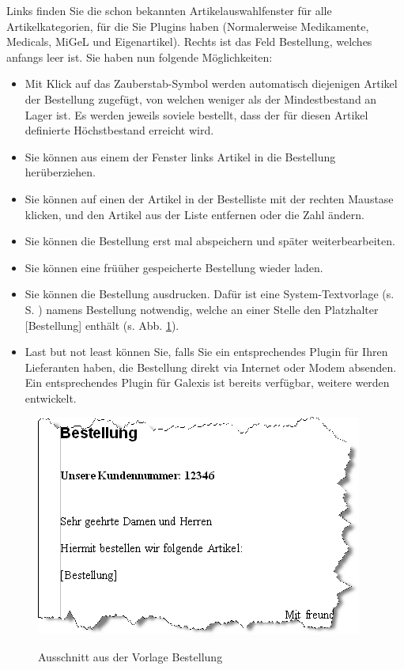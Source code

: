 Links finden Sie die schon bekannten Artikelauswahlfenster für alle
Artikelkategorien, für die Sie Plugins haben (Normalerweise Medikamente,
Medicals, MiGeL und Eigenartikel). Rechts ist das Feld Bestellung, welches
anfangs leer ist. Sie haben nun folgende Möglichkeiten:
\begin{itemize}
  \item Mit Klick auf das Zauberstab-Symbol werden automatisch diejenigen
  Artikel der Bestellung zugefügt, von welchen weniger als der Mindestbestand an
  Lager ist. Es werden jeweils soviele bestellt, dass der für diesen Artikel
  definierte Höchstbestand erreicht wird.
  \item Sie können aus einem der Fenster links Artikel in die Bestellung
  herüberziehen.
	\item Sie können auf einen der Artikel in der Bestelliste mit der rechten
	Maustase klicken, und den Artikel aus der Liste entfernen oder die Zahl ändern.
	
	\item Sie können die Bestellung erst mal abspeichern und später weiterbearbeiten.
	
	\item Sie können eine früüher gespeicherte Bestellung wieder laden.
	\item Sie können die Bestellung ausdrucken. Dafür ist eine System-Textvorlage (s. S.
	\pageref{textvorlagen}) namens \glqq Bestellung\grqq{} notwendig, welche an
	einer Stelle den Platzhalter [Bestellung] enthält (s. Abb. \ref{fig:bestell2}).
	\item Last but not least können Sie, falls Sie ein entsprechendes Plugin für
	Ihren Lieferanten haben, die Bestellung direkt via Internet oder Modem
	absenden. Ein entsprechendes Plugin für Galexis ist bereits verfügbar, weitere
	werden entwickelt.
\end{itemize}
\begin{figure}[hb]
  \includegraphics{images/bestell2}\\
  \caption{Ausschnitt aus der Vorlage Bestellung}\label{fig:bestell2}
\end{figure}




